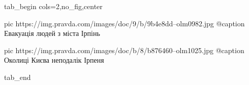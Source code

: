  
 
 
 
 


\ifcmt
  tab_begin cols=2,no_fig,center

     pic https://img.pravda.com/images/doc/9/b/9b4e8dd--olm0982.jpg
		 @caption Евакуація людей з міста Ірпінь

		 pic https://img.pravda.com/images/doc/b/8/b876460--olm1025.jpg
		 @caption Околиці Києва неподалік Ірпеня

  tab_end
\fi
